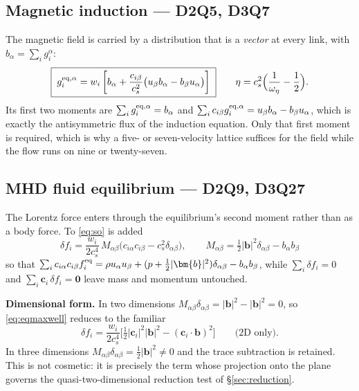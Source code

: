 \documentclass[11pt,a4paper]{article}
\newcommand{\cs}{c_s}
\newcommand{\ci}{\bm{c}_i}
\newcommand{\bb}{\bm{b}}
\begin{document}
\subsection{Magnetic induction --- D2Q5, D3Q7}
\label{sec:eqmag}

The magnetic field is carried by a distribution that is a \emph{vector} at every
link, with $b_\alpha=\sum_i g_i^\alpha$:
\begin{equation}
  \boxed{\;
  g_i^{{\rm eq},\alpha} = w_i\left[b_\alpha
    + \frac{c_{i\beta}}{\cs^2}\big(u_\beta b_\alpha - b_\beta u_\alpha\big)\right]\;}
  \qquad
  \eta = \cs^2\Big(\frac{1}{\omega_\eta}-\frac12\Big).
  \label{eq:eqmag}
\end{equation}
Its first two moments are $\sum_i g_i^{\rm eq,\alpha}=b_\alpha$ and
$\sum_i c_{i\beta}g_i^{{\rm eq},\alpha}=u_\beta b_\alpha - b_\beta u_\alpha$,
which is exactly the antisymmetric flux of the induction equation. Only that
first moment is required, which is why a five- or seven-velocity lattice suffices
for the field while the flow runs on nine or twenty-seven.

\subsection{MHD fluid equilibrium --- D2Q9, D3Q27}
\label{sec:eqmhd}

The Lorentz force enters through the equilibrium's second moment rather than as a
body force. To \eqref{eq:so} is added
\begin{equation}
  \boxed{\;
  \delta f_i = \frac{w_i}{2\cs^4}\,M_{\alpha\beta}
    \big(c_{i\alpha}c_{i\beta} - \cs^2\delta_{\alpha\beta}\big),
  \qquad
  M_{\alpha\beta} = \tfrac12|\bb|^2\delta_{\alpha\beta} - b_\alpha b_\beta \;}
  \label{eq:eqmaxwell}
\end{equation}
so that $\sum_i c_{i\alpha}c_{i\beta}f_i^{\rm eq}
= \rho u_\alpha u_\beta + (p+\tfrac12|\bb|^2)\delta_{\alpha\beta} - b_\alpha b_\beta$,
while $\sum_i\delta f_i=0$ and $\sum_i\ci\,\delta f_i=\bm0$ leave mass and
momentum untouched.

\medskip
\noindent\textbf{Dimensional form.} In two dimensions
$M_{\alpha\beta}\delta_{\alpha\beta}=|\bb|^2-|\bb|^2=0$, so \eqref{eq:eqmaxwell}
reduces to the familiar
\begin{equation}
  \delta f_i = \frac{w_i}{2\cs^4}
    \Big[\tfrac12|\ci|^2|\bb|^2 - (\ci\!\cdot\!\bb)^2\Big]
  \qquad\text{(2D only)} .
\end{equation}
In three dimensions $M_{\alpha\beta}\delta_{\alpha\beta}=\tfrac12|\bb|^2\neq0$ and
the trace subtraction is retained. This is not cosmetic: it is precisely the term
whose projection onto the plane governs the quasi-two-dimensional reduction test
of \S\ref{sec:reduction}.
\end{document}
